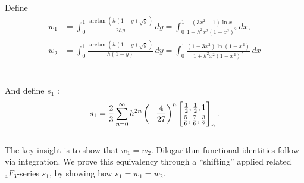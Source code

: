 \documentclass[12pt]{article}
\begin{document}
Define 
\begin{align}
w_1 &= \int_0^1 \frac{\arctan\left(h(1-y)\sqrt{y}\right)}{2hy}\,dy 
= \int_{0}^{1} \frac{(3x^2-1)\ln x}{1 + h^2 x^2(1-x^2)^2}\,dx 
, \label{eq:w1} \\[10pt]
w_2 &= \int_0^1 \frac{\arctan\left(h(1-y)\sqrt{y}\right)}{h(1-y)}\,dy 
= \int_{0}^{1} \frac{(1-3x^2)\ln(1-x^2)}{1 + h^2 x^2(1-x^2)^2}\,dx 
 \label{eq:w2}
\end{align}
\\
\\
And define $s_1$ \ddag: 
\begin{equation}\label{displays1}
 s_1 = \frac{2}{3}\sum_{n=0}^{\infty} 
 h^{2n} \left( -\frac{4}{27} \right)^{n} 
 \left[ \begin{matrix} \frac{1}{2}, \frac{1}{2}, 1 
 \vspace{1mm} \\ 
 \frac{5}{6}, \frac{7}{6}, \frac{3}{2} \end{matrix} \right]_{n}. 
\end{equation}
\\
 The key insight is to show that $w_1=w_2$. Dilogarithm functional identities follow via integration. We prove this equivalency through a ``shifting'' applied related ${}_{4}F_{3}$-series $s_1$, by showing how $s_1=w_1=w_2$. 
\end{document}
